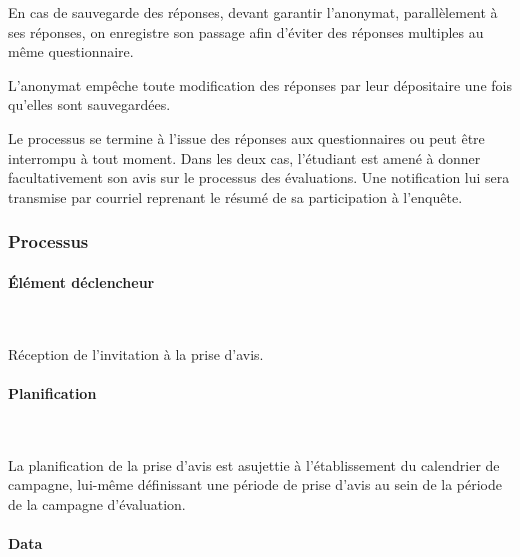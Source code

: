 \documentclass[a4paper,11pt]{report}
\begin{document}
En cas de sauvegarde des réponses, devant garantir l'anonymat, parallèlement à ses réponses, on enregistre son passage afin d'éviter des réponses multiples au même questionnaire.

L'anonymat empêche toute modification des réponses par leur dépositaire une fois qu'elles sont sauvegardées.

Le processus se termine à l'issue des réponses aux questionnaires ou peut être interrompu à tout moment.
Dans les deux cas, l'étudiant est amené à donner facultativement son avis sur le processus des évaluations.
Une notification lui sera transmise par courriel reprenant le résumé de sa participation à l'enquête.


\subsubsection{Processus}
\paragraph{Élément déclencheur}~\newline{}

Réception de l'invitation à la prise d'avis.

\paragraph{Planification}~\newline{}

La planification de la prise d'avis est asujettie à l'établissement du calendrier de campagne, lui-même définissant une période de prise d'avis au sein de la période de la campagne d'évaluation.

\paragraph{Data}~\newline{}
\end{document}
